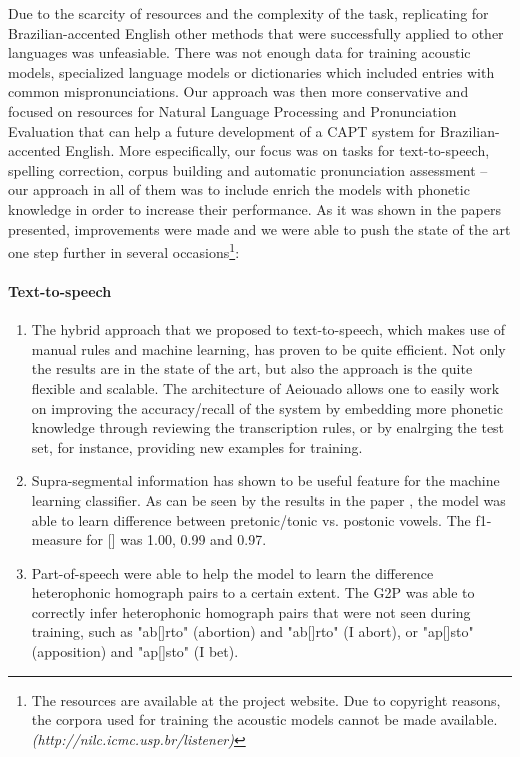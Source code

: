 Due to the scarcity of resources and the complexity of the task, replicating for Brazilian-accented English other methods that were successfully applied to other languages was unfeasiable. There was not enough data for training acoustic models, specialized language models or dictionaries which included entries with common mispronunciations. Our approach was then more conservative and focused on resources for Natural Language Processing and Pronunciation Evaluation that can help a future development of a \ac{CAPT} system for Brazilian-accented English. More especifically, our focus was on tasks for text-to-speech, spelling correction, corpus building and automatic pronunciation assessment -- our approach in all of them was to include enrich the models with phonetic knowledge in order to increase their performance. As it was shown in the papers presented, improvements were made and we were able to push the state of the art one step further in several occasions\footnote{The resources are available at the project website. Due to copyright reasons, the corpora used for training the acoustic models cannot be made available.  \emph{(http://nilc.icmc.usp.br/listener)}}:

\paragraph*{Text-to-speech}
  \begin{enumerate}
    \item The hybrid approach that we proposed to text-to-speech, which makes use of manual rules and machine learning, has proven to be quite efficient. Not only the results are in the state of the art, but also the approach is the quite flexible and scalable. The architecture of Aeiouado allows one to easily work on improving the accuracy/recall of the system by embedding more phonetic knowledge through reviewing the transcription rules, or by enalrging the test set, for instance, providing new examples for training.
    \item Supra-segmental information has shown to be useful feature for the machine learning classifier. As can be seen by the results in the paper \cite{Mendonca2014}, the model was able to learn difference between pretonic/tonic vs. postonic vowels. The f1-measure for [] was 1.00, 0.99 and 0.97. 
    \item Part-of-speech were able to help the model to learn the difference heterophonic homograph pairs to a certain extent. The G2P was able to correctly infer heterophonic homograph pairs that were not seen during training, such as "ab[]rto" (abortion) and "ab[]rto" (I abort), or "ap[]sto" (apposition) and "ap[]sto" (I bet).
  \end{enumerate}

